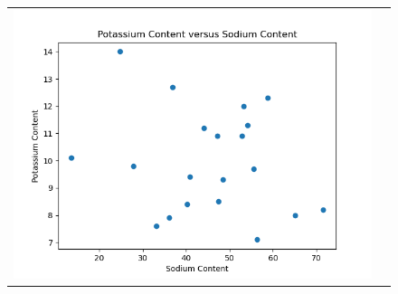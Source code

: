 \begin{enumerate}[label=(\alph*)]
\begin{figure}[H]
\begin{tabular}{cc}
            \includegraphics[scale=0.325]{./python/chapter-5/Question-5-4-Sodium-vs-Potassium.png}
        \end{tabular}
    \end{figure}

\end{enumerate}